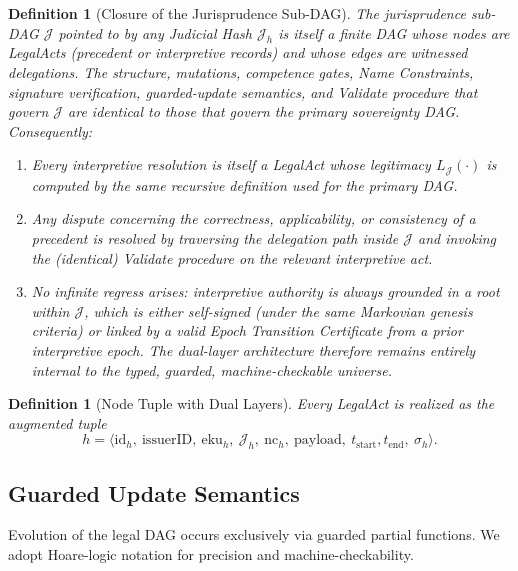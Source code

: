 \documentclass[11pt,a4paper]{article}
\newtheorem{definition}[theorem]{Definition}
\begin{document}
\begin{definition}[Closure of the Jurisprudence Sub-DAG]
The jurisprudence sub-DAG \(\mathcal{J}\) pointed to by any Judicial Hash \(\mathcal{J}_h\) is itself a finite DAG whose nodes are LegalActs (precedent or interpretive records) and whose edges are witnessed delegations. The structure, mutations, competence gates, Name Constraints, signature verification, guarded-update semantics, and Validate procedure that govern \(\mathcal{J}\) are identical to those that govern the primary sovereignty DAG. Consequently:

\begin{enumerate}
\item Every interpretive resolution is itself a LegalAct whose legitimacy \(L_{\mathcal{J}}(\cdot)\) is computed by the same recursive definition used for the primary DAG.

\item Any dispute concerning the correctness, applicability, or consistency of a precedent is resolved by traversing the delegation path inside \(\mathcal{J}\) and invoking the (identical) Validate procedure on the relevant interpretive act.

\item No infinite regress arises: interpretive authority is always grounded in a root within \(\mathcal{J}\), which is either self-signed (under the same Markovian genesis criteria) or linked by a valid Epoch Transition Certificate from a prior interpretive epoch. The dual-layer architecture therefore remains entirely internal to the typed, guarded, machine-checkable universe.
\end{enumerate}
\end{definition}

\begin{definition}[Node Tuple with Dual Layers]
Every LegalAct is realized as the augmented tuple
\[
h = \langle \text{id}_h,\ \text{issuerID},\ \text{eku}_h,\ \mathcal{J}_h,\ \text{nc}_h,\ \text{payload},\ t_{\text{start}}, t_{\text{end}},\ \sigma_h \rangle.
\]
\end{definition}

\subsection{Guarded Update Semantics}

Evolution of the legal DAG occurs exclusively via guarded partial functions. We adopt Hoare-logic notation for precision and machine-checkability.
\end{document}
